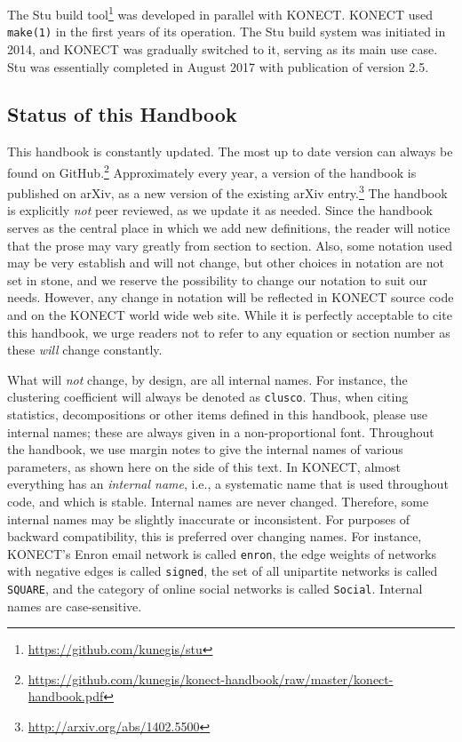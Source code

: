 \documentclass{article}
\begin{document}
The Stu build
tool\footnote{\href{https://github.com/kunegis/stu}{https://github.com/kunegis/stu}}
was developed in parallel with KONECT.  KONECT used \texttt{make(1)} in
the first years of its operation.  The Stu build system was initiated in
2014, and KONECT was gradually switched to it, serving as its main use
case.  Stu was essentially completed in August 2017 with publication of version 2.5. 

\subsection{Status of this Handbook}
This handbook is constantly updated.  The most up to date version can
always be found on
GitHub.\footnote{\href{https://github.com/kunegis/konect-handbook/raw/master/konect-handbook.pdf}{https://github.com/kunegis/konect-handbook/raw/master/konect-handbook.pdf}}  
Approximately every year, a version of the handbook is published on
arXiv, as a new version of the existing arXiv
entry.\footnote{\href{http://arxiv.org/abs/1402.5500}{http://arxiv.org/abs/1402.5500}} 
The handbook is explicitly \emph{not} peer reviewed, as we update it as
needed.  Since the handbook serves as the central place in which we add
new definitions, the reader will notice that the prose may vary greatly
from section to section.  Also, some notation used may be very establish
and will not change, but other choices in notation are not set in stone,
and we reserve the possibility to change our notation to suit our
needs.  However, any change in notation will be reflected in KONECT
source code and on the KONECT world wide web site.  While it is
perfectly acceptable to cite this handbook, we urge readers not to refer
to any equation or section number as these \emph{will} change
constantly.  

What will \emph{not} change, by design, are all internal
names.  For instance, the clustering coefficient will always be denoted
as \texttt{clusco}.  Thus, when citing statistics, decompositions or
other items defined in this handbook, please use internal names; these
are always given in a non-proportional font. 
Throughout the handbook, we use margin notes to give the internal 
names of various parameters, as shown here on the side of this text.  
In KONECT, almost everything has an \emph{internal name}, i.e., a
systematic name that is used throughout code, and which is stable.
Internal names are never changed.  Therefore, some internal names may be
slightly inaccurate or inconsistent.  For purposes of backward
compatibility, this is preferred over changing names.  For instance,
KONECT's Enron email network is called \texttt{enron}, the edge weights
of networks with negative edges is called \texttt{signed}, the set
of all unipartite networks is called \texttt{SQUARE}, and the category
of online social networks is called \texttt{Social}.  Internal names are
case-sensitive. 
\end{document}
